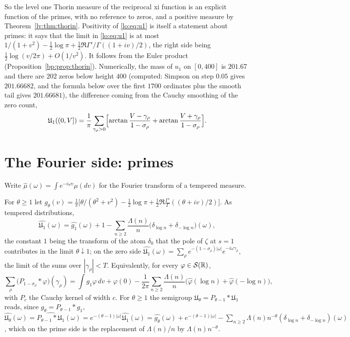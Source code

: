 So the level one Thorin measure of the reciprocal xi function is an explicit function of the primes, with no reference to zeros, and a positive measure by Theorem~\ref{lv:thm:thorin}. Positivity of \eqref{lo:eq:u1} is itself a statement about primes: it says that the limit in \eqref{lo:eq:u1} is at most $1/(1+v^2)-\tfrac12\log\pi+\tfrac12\Re\Gamma'/\Gamma((1+iv)/2)$, the right side being $\tfrac12\log(v/2\pi)+O(1/v^2)$. It follows from the Euler product (Proposition~\ref{bp:prop:thorin}). Numerically, the mass of $u_1$ on $[0,400]$ is $201.67$ and there are $202$ zeros below height $400$ (computed: Simpson on step $0.05$ gives $201.66682$, and the formula below over the first $1700$ ordinates plus the smooth tail gives $201.66681$), the difference coming from the Cauchy smoothing of the zero count,
\[
\mathfrak U_1((0,V])=\frac1\pi\sum_{\gamma_\rho>0}\Bigl[\arctan\frac{V-\gamma_\rho}{1-\sigma_\rho}+\arctan\frac{V+\gamma_\rho}{1-\sigma_\rho}\Bigr].
\]

\section{The Fourier side: primes}\label{lo:sec:fourier}

Write $\widehat\mu(\omega)=\int e^{-i\omega v}\mu(dv)$ for the Fourier transform of a tempered measure.

\begin{proposition}\label{lo:prop:spectrum}
For $\theta\ge1$ let $g_\theta(v)=\frac1\pi\bigl[\theta/(\theta^2+v^2)-\tfrac12\log\pi+\tfrac12\Re\frac{\Gamma'}{\Gamma}((\theta+iv)/2)\bigr]$. As tempered distributions,
\begin{equation}\label{lo:eq:spectrum}
\widehat{\mathfrak U_1}(\omega)=\widehat{g_1}(\omega)+1-\sum_{n\ge2}\frac{\Lambda(n)}{n}\bigl(\delta_{\log n}+\delta_{-\log n}\bigr)(\omega),
\end{equation}
the constant $1$ being the transform of the atom $\delta_0$ that the pole of $\zeta$ at $s=1$ contributes in the limit $\theta\downarrow1$; on the zero side $\widehat{\mathfrak U_1}(\omega)=\sum_\rho e^{-(1-\sigma_\rho)|\omega|}e^{-i\omega\gamma_\rho}$, the limit of the sums over $|\gamma_\rho|<T$. Equivalently, for every $\varphi\in\mathcal S(\mathbb{R})$,
\begin{equation}\label{lo:eq:weil}
\sum_\rho\bigl(P_{1-\sigma_\rho}*\varphi\bigr)(\gamma_\rho)=\int g_1\varphi\,dv+\varphi(0)-\frac1{2\pi}\sum_{n\ge2}\frac{\Lambda(n)}{n}\bigl(\widehat\varphi(\log n)+\widehat\varphi(-\log n)\bigr),
\end{equation}
with $P_c$ the Cauchy kernel of width $c$. For $\theta\ge1$ the semigroup $\mathfrak U_\theta=P_{\theta-1}*\mathfrak U_1$ reads, since $g_\theta=P_{\theta-1}*g_1$, $\widehat{\mathfrak U_\theta}(\omega)=\widehat{P_{\theta-1}*\mathfrak U_1}(\omega)=e^{-(\theta-1)|\omega|}\widehat{\mathfrak U_1}(\omega)=\widehat{g_\theta}(\omega)+e^{-(\theta-1)|\omega|}-\sum_{n\ge2}\Lambda(n)n^{-\theta}(\delta_{\log n}+\delta_{-\log n})(\omega)$, which on the prime side is the replacement of $\Lambda(n)/n$ by $\Lambda(n)n^{-\theta}$.
\end{proposition}

